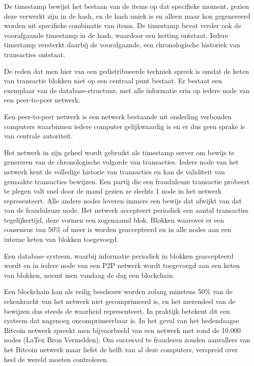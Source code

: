 	De timestamp bewijst het bestaan van de items op dat specifieke moment, gezien deze verwerkt zijn in de hash, en de hash uniek is en alleen maar kon gegenereerd worden uit specifieke combinatie van items. De timestamp bevat verder ook de voorafgaande timestamp in de hash, waardoor een ketting ontstaat. Iedere timestamp versterkt daarbij de voorafgaande, een chronologische historiek van transacties ontstaat.
	
	De reden dat men hier van een gedistribueerde techniek spreek is omdat de keten van transactie blokken niet op een centraal punt bestaat. Er bestaat een exemplaar van de database-structuur, met alle informatie erin op iedere node van een peer-to-peer netwerk. 
	
	Een peer-to-peer netwerk is een netwerk bestaande uit onderling verbonden computers waarbinnen iedere computer gelijkwaardig is en er dus geen sprake is van centrale autoriteit. 
	
	Het netwerk in zijn geheel wordt gebruikt als timestamp server om bewijs te genereren van de chronologische volgorde van transacties. Iedere node van het netwerk kent de volledige historie van transacties en kan de validiteit van gemaakte transacties bewijzen. Een partij die een frauduleuze transactie probeert te plegen valt snel door de mand gezien ze slechts 1 node in het netwerk representeert. Alle andere nodes leveren immers een bewijs dat afwijkt van dat van de frauduleuze node. Het netwerk accepteert periodiek een aantal transacties tegelijkertijd, deze vormen een zogenaamd blok. Blokken waarover er een consensus van 50\% of meer is worden geaccepteerd en in alle nodes aan een interne keten van blokken toegevoegd.
	
	Een database systeem, waarbij informatie periodiek in blokken geaccepteerd wordt en in iedere node van een P2P netwerk wordt toegevoegd aan een keten van blokken, noemt men vandaag de dag een blockchain.
	
	Een blockchain kan als veilig beschouw worden zolang minstens 50\% van de rekenkracht van het netwerk niet gecomprimeerd is, en het merendeel van de bewijzen dus steeds de waarheid representeert. In praktijk betekent dit een systeem dat nagenoeg oncomprimeerbaar is. In het geval van het hedendaagse Bitcoin netwerk spreekt men bijvoorbeeld van een netwerk met rond de 10.000 nodes (LaTex Bron Vermelden). Om succesvol te frauderen zouden aanvallers van het Bitcoin netwerk maar liefst de helft van al deze computers, verspreid over heel de wereld moeten controleren. 
			
